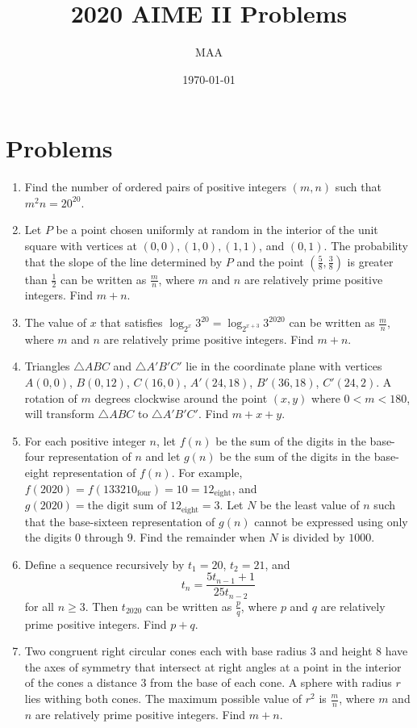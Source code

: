 \documentclass{article}%
\title{2020 AIME II Problems}%
\author{MAA}%
\date{\today}%
\begin{document}
%
\normalsize%
\maketitle%
\section{Problems}%
\label{sec:Problems}%
\begin{enumerate}%
\item%
Find the number of ordered pairs of positive integers $(m,n)$ such that ${m^2n = 20 ^{20}}$.
%
\item%
Let $P$ be a point chosen uniformly at random in the interior of the unit square with vertices at $(0,0), (1,0), (1,1)$, and $(0,1)$. The probability that the slope of the line determined by $P$ and the point $\left(\frac58, \frac38 \right)$ is greater than $\frac12$ can be written as $\frac{m}{n}$, where $m$ and $n$ are relatively prime positive integers. Find $m+n$.
%
\item%
The value of $x$ that satisfies $\log_{2^x} 3^{20} = \log_{2^{x+3}} 3^{2020}$ can be written as $\frac{m}{n}$, where $m$ and $n$ are relatively prime positive integers. Find $m+n$.
%
\item%
Triangles $\triangle ABC$ and $\triangle A'B'C'$ lie in the coordinate plane with vertices $A(0,0)$, $B(0,12)$, $C(16,0)$, $A'(24,18)$, $B'(36,18)$, $C'(24,2)$. A rotation of $m$ degrees clockwise around the point $(x,y)$ where $0<m<180$, will transform $\triangle ABC$ to $\triangle A'B'C'$. Find $m+x+y$.
%
\item%
For each positive integer $n$, let $f(n)$ be the sum of the digits in the base-four representation of $n$ and let $g(n)$ be the sum of the digits in the base-eight representation of $f(n)$. For example, $f(2020) = f(133210_{\text{four}}) = 10 = 12_{\text{eight}}$, and $g(2020) = \text{the digit sum of }12_{\text{eight}} = 3$. Let $N$ be the least value of $n$ such that the base-sixteen representation of $g(n)$ cannot be expressed using only the digits $0$ through $9$. Find the remainder when $N$ is divided by $1000$.
%
\item%
Define a sequence recursively by $t_1 = 20$, $t_2 = 21$, and\[t_n = \frac{5t_{n-1}+1}{25t_{n-2}}\]for all $n \ge 3$. Then $t_{2020}$ can be written as $\frac{p}{q}$, where $p$ and $q$ are relatively prime positive integers. Find $p+q$.
%
\item%
Two congruent right circular cones each with base radius $3$ and height $8$ have the axes of symmetry that intersect at right angles at a point in the interior of the cones a distance $3$ from the base of each cone. A sphere with radius $r$ lies withing both cones. The maximum possible value of $r^2$ is $\frac{m}{n}$, where $m$ and $n$ are relatively prime positive integers. Find $m+n$.

\end{enumerate}
\end{document}
